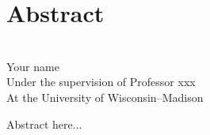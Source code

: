 \chapter*{Abstract}
\relax{}

\begin{center}
     {\textbf{\expandafter%
     \expandafter{\@title}}}\\
     \vspace{12pt}
     Your name \\
     \vspace{12pt}
     Under the supervision of Professor xxx\\
     At the University of Wisconsin--Madison
\end{center}

Abstract here...
\clearpage
